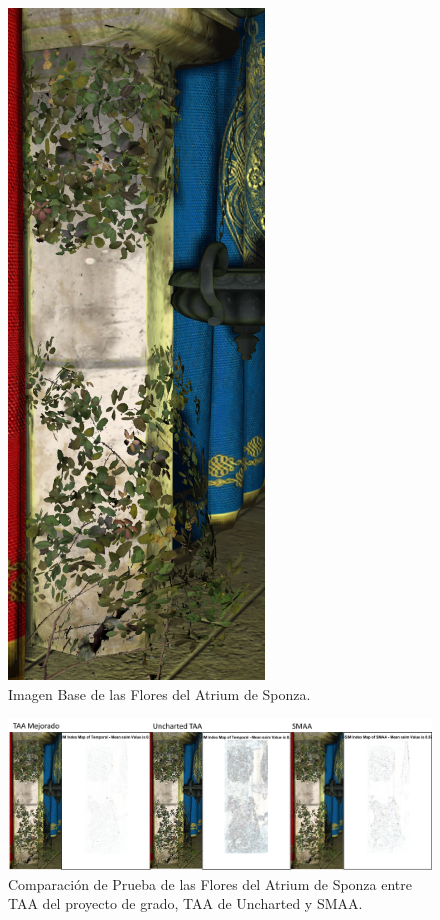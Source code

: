 \documentclass[pregrado]{tesis-usb} %
\begin{document}
\begin{figure}[!htb]
	\centering
	\includegraphics[scale=0.2]{images/results/sponza_flowers_sobel_ground_truth.png}
	\caption{Imagen Base de las Flores del Atrium de Sponza.}\label{fig:sponza_flowers_truth}
\end{figure}

\begin{figure}[!htb]
	\centering
	\includegraphics[scale=0.3]{images/results/sponza_flowers.png}
	\caption{Comparación de Prueba de las Flores del Atrium de Sponza entre TAA del proyecto de grado, TAA de Uncharted y SMAA.}\label{fig:sponza_flowers_render}
\end{figure}
\end{document}
